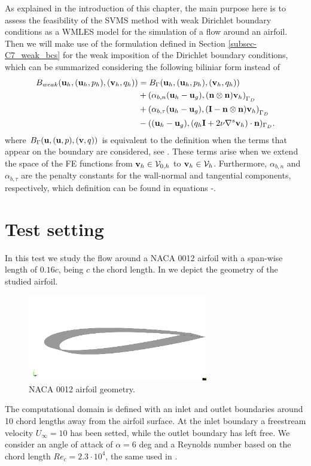 As explained in the introduction of this chapter, the main purpose here is to assess the feasibility of the SVMS method with weak Dirichlet boundary conditions as a WMLES model for the simulation of a flow around an airfoil. Then we will make use of the formulation defined in Section \ref{subsec-C7_weak_bcs} for the weak imposition of the Dirichlet boundary conditions, which can be summarized considering the following biliniar form instead of 
\begin{align}
\label{eq-C8_bilinear_weak_by_components}
B_{weak}({\bf u}_h,({\bf u}_h,p_h),({\bf v}_h,q_h))&=B_\Gamma({\bf u}_h,({\bf u}_h,p_h),({\bf v}_h,q_h))\\\nonumber
&+\left(\alpha_{b,n}({\bf u}_h-{\bf u}_g),({\bf n}\otimes{\bf n}){\bf v}_h\right)_{\Gamma_D}\\\nonumber
&+\left(\alpha_{b,\tau}({\bf u}_h-{\bf u}_g),(\mathbf{I}-{\bf n}\otimes{\bf n}){\bf v}_h\right)_{\Gamma_D}\\\nonumber
&-(({\bf u}_h-{\bf u}_g),(q_h\mathbf{I}+2\nu\nabla^s{\bf v}_h)\cdot{\bf n})_{\Gamma_D}.
\end{align}
where $ B_\Gamma({\bf u},({\bf u},p),({\bf v},q)) $ is equivalent to the definition  when the terms that appear on the boundary are considered, see . These terms arise when we extend the space of the FE functions from $ {\bf v}_h\in\mathcal{V}_{0,h} $ to $ {\bf v}_h\in\mathcal{V}_h $. Furthermore, $ \alpha_{b,n} $ and $ \alpha_{b,\tau} $ are the penalty constants for the wall-normal and tangential components, respectively, which definition can be found in equations -.

\section{Test setting}
\label{sec-C8_setting}
In this test we study the flow around a NACA 0012 airfoil with a span-wise length of $ 0.16c $, being $ c $ the chord length. In  we depict the geometry of the studied airfoil.
\begin{figure}[h!]
  \centering
  \includegraphics[width=0.7\textwidth,clip=true,trim=5cm 8cm 1cm 8cm]{Figures/Chapter8/geometry_3d}
  \caption{NACA 0012 airfoil geometry.}
  \label{fig-NACA_geometry}
\end{figure}
The computational domain is defined with an inlet and outlet boundaries around 10 chord lengths away from the airfoil surface. At the inlet boundary a freestream velocity $U_\infty=10$ has been setted, while the outlet boundary has left free. We consider an angle of attack of $ \alpha = 6 $ deg and a Reynolds number based on the chord length $ Re_c=2.3\cdot10^4 $, the same used in \cite{kojima,kim}.

